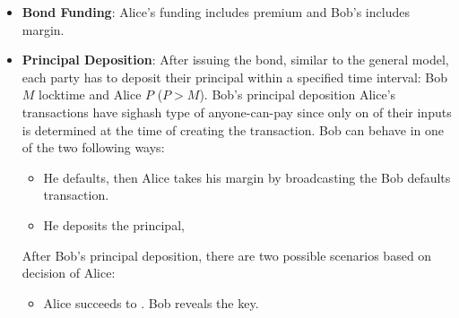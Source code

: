 \begin{itemize}
    \item \textbf{Bond Funding}: Alice's funding includes premium and Bob's includes margin.   \new{\Aone} 
    
    \item \textbf{Principal Deposition}: 
        After issuing the bond, similar to the general model, each party has to deposit their principal within a specified time interval: Bob $M$ locktime and Alice $P$ ($P > M$).  Bob's principal deposition   Alice's  transactions have sighash type of anyone-can-pay since only on of their inputs is determined at the time of creating the transaction. Bob can behave in one of the two following ways:
    \begin{itemize}
        \item He defaults, then Alice takes his margin by broadcasting the Bob defaults transaction.
        \item He deposits the principal, 
    \end{itemize}
    
    After Bob's principal deposition, there are two possible scenarios based on decision of Alice: 
    \begin{itemize}
        \item Alice succeeds to . Bob reveals the \keyone key. %
        

\end{itemize}
\end{itemize}

